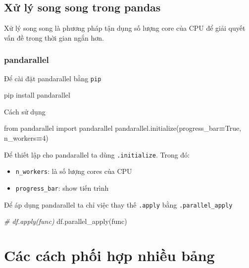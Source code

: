 \documentclass[
]{book}
\newenvironment{Shaded}{\begin{snugshade}}{\end{snugshade}}
\newcommand{\CommentTok}[1]{\textcolor[rgb]{0.56,0.35,0.01}{\textit{#1}}}
\newcommand{\DecValTok}[1]{\textcolor[rgb]{0.00,0.00,0.81}{#1}}
\newcommand{\ImportTok}[1]{#1}
\newcommand{\NormalTok}[1]{#1}
\newcommand{\OperatorTok}[1]{\textcolor[rgb]{0.81,0.36,0.00}{\textbf{#1}}}
\newcommand{\VariableTok}[1]{\textcolor[rgb]{0.00,0.00,0.00}{#1}}
\begin{document}
\section{Xử lý song song trong pandas}\label{xux1eed-luxfd-song-song-trong-pandas}

Xử lý song song là phương pháp tận dụng số lượng core của CPU để giải quyết vấn đề trong thời gian ngắn hơn.

\subsection{pandarallel}\label{pandarallel}

Để cài đặt pandarallel bằng \texttt{pip}

\begin{Shaded}
\begin{Highlighting}[]
\NormalTok{pip install pandarallel}
\end{Highlighting}
\end{Shaded}

Cách sử dụng

\begin{Shaded}
\begin{Highlighting}[]
\ImportTok{from}\NormalTok{ pandarallel }\ImportTok{import}\NormalTok{ pandarallel}
\NormalTok{pandarallel.initialize(progress\_bar}\OperatorTok{=}\VariableTok{True}\NormalTok{, n\_workers}\OperatorTok{=}\DecValTok{4}\NormalTok{)}
\end{Highlighting}
\end{Shaded}

Để thiết lập cho pandarallel ta dùng \texttt{.initialize}. Trong đó:

\begin{itemize}
\item
  \texttt{n\_workers}: là số lượng cores của CPU
\item
  \texttt{progress\_bar}: show tiến trình
\end{itemize}

Để áp dụng pandarallel ta chỉ việc thay thế \texttt{.apply} bằng \texttt{.parallel\_apply}

\begin{Shaded}
\begin{Highlighting}[]
\CommentTok{\# df.apply(func)}
\NormalTok{df.parallel\_apply(func)}
\end{Highlighting}
\end{Shaded}

\chapter{Các cách phối hợp nhiều bảng}\label{cuxe1c-cuxe1ch-phux1ed1i-hux1ee3p-nhiux1ec1u-bux1ea3ng}
\end{document}
